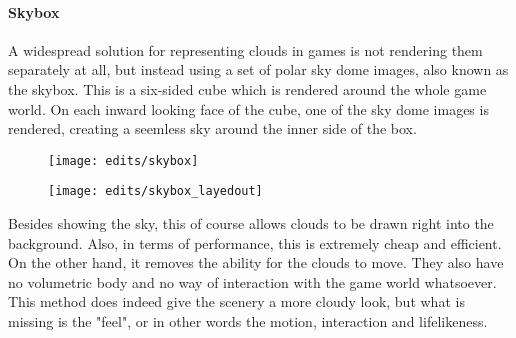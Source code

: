 \paragraph{Skybox}
A widespread solution for representing clouds in games is not rendering them separately at all, but instead using a set of polar sky dome images, also known as the skybox. This is a six-sided cube which is rendered around the whole game world. On each inward looking face of the cube, one of the sky dome images is rendered, creating a seemless sky around the inner side of the box.
\begin{figure}[H]
    \centering
        \begin{minipage}{0.47\linewidth}
            \texttt{[image: edits/skybox]}
            \label{img:edits:skybox}
        \end{minipage}
    \hfill
        \begin{minipage}{0.45\linewidth}
            \texttt{[image: edits/skybox\_layedout]}
            \label{img:edits:skybox_layedout}
        \end{minipage}
\end{figure}

\noindent
Besides showing the sky, this of course allows clouds to be drawn right into the background. Also, in terms of performance, this is extremely cheap and efficient. On the other hand, it removes the ability for the clouds to move. They also have no volumetric body and no way of interaction with the game world whatsoever.
\\
This method does indeed give the scenery a more cloudy look, but what is missing is the "feel", or in other words the motion, interaction and lifelikeness.

